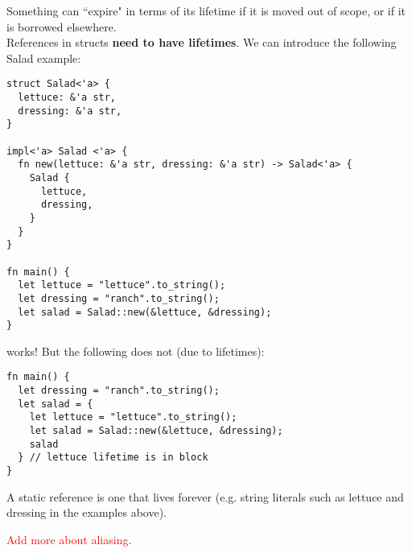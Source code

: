 Something can ``expire" in terms of its lifetime if it is moved out of scope, or if it is borrowed elsewhere. \\

References in structs \textbf{need to have lifetimes}. We can introduce the following Salad example:
\begin{lstlisting}[frame = none]
struct Salad<'a> {
  lettuce: &'a str,
  dressing: &'a str,
}

impl<'a> Salad <'a> {
  fn new(lettuce: &'a str, dressing: &'a str) -> Salad<'a> {
    Salad {
      lettuce,
      dressing,
    }
  }
}

fn main() {
  let lettuce = "lettuce".to_string();
  let dressing = "ranch".to_string();
  let salad = Salad::new(&lettuce, &dressing);
}
\end{lstlisting}

works! But the following does not (due to lifetimes):
\begin{lstlisting}[frame = none]
fn main() {
  let dressing = "ranch".to_string();
  let salad = {
    let lettuce = "lettuce".to_string();
    let salad = Salad::new(&lettuce, &dressing);
    salad
  } // lettuce lifetime is in block
}
\end{lstlisting}

\begin{definition}
A static reference is one that lives forever (e.g. string literals such as lettuce and dressing in the examples above).
\end{definition}

\textcolor{red}{Add more about aliasing}.